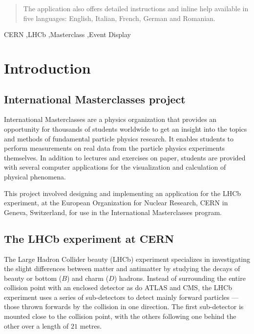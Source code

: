 \documentclass[3p,times,twocolumn]{elsarticle}
\begin{document}
\begin{frontmatter}
\begin{abstract}
The application also offers detailed instructions and inline help available in five languages: English, Italian, French, German and Romanian.

\end{abstract}

\begin{keyword}

CERN \sep LHCb \sep Masterclass \sep Event Display 
\end{keyword}

\end{frontmatter}


\section{Introduction}
\subsection{International Masterclasses project}
International Masterclasses are a physics organization that provides an opportunity for thousands of students worldwide to get an insight into the topics and methods of fundamental particle physics research. It enables students to perform measurements on real data from the particle physics experiments themselves. In addition to lectures and exercises on paper, students are provided with several computer applications for the visualization and calculation of physical phenomena. \par
This project involved designing and implementing an application for the LHCb experiment, at the European Organization for Nuclear Research, CERN in Geneva, Switzerland, for use in the International Masterclasses program.
\subsection{The LHCb experiment at CERN}
The Large Hadron Collider beauty (LHCb) experiment specializes in investigating the slight differences between matter and antimatter by studying the decays of beauty or bottom ($B$) and charm ($D$) hadrons. Instead of surrounding the entire collision point with an enclosed detector as do ATLAS and CMS, the LHCb experiment uses a series of sub-detectors to detect mainly forward particles --- those thrown forwards by the collision in one direction. The first sub-detector is mounted close to the collision point, with the others following one behind the other over a length of $21$ metres. \par
\end{document}
